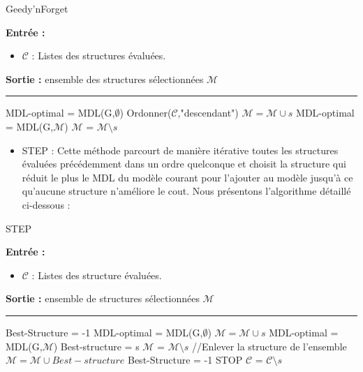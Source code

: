 \documentclass[a4paper,oneside,12pt]{report}
\theoremstyle{definition}
\begin{document}
\begin{algorithm}[H]
\label{alg:GNF}
	\caption{Geedy'nForget}
		\textbf{Entrée :}
		\begin{itemize}[label=$\bullet$]
			\item $\mathcal{C}$ : Listes des structures évaluées.
							
							
			\end{itemize}
	\textbf{Sortie :} ensemble des structures sélectionnées $\mathcal{M}$\\							\noindent\rule{\textwidth}{1pt}
								
	\begin{algorithmic} [1]
	 \STATE MDL-optimal = MDL(G,$\emptyset$)
\STATE Ordonner($\mathcal{C}$,"descendant") 
	\STATE $\mathcal{M} = \mathcal{M} \cup {s}$ 
			\STATE MDL-optimal = MDL(G,$\mathcal{M}$)
		\ELSE 
			\STATE $\mathcal{M}$ = $\mathcal{M} \setminus {s}$  
		\ENDIF
	\ENDFOR   
	\end{algorithmic}
		\end{algorithm}

\begin{itemize}
\item STEP : Cette méthode parcourt de manière itérative toutes les structures évaluées précédemment dans un ordre quelconque et choisit la structure qui réduit le plus le MDL du modèle courant pour l'ajouter au modèle jusqu'à ce qu'aucune structure n'améliore le cout. Nous présentons l'algorithme détaillé ci-dessous :


\end{itemize}

\begin{algorithm}[H]
\label{alg:STEP}
	\caption{STEP}
		\textbf{Entrée :}
		\begin{itemize}[label=$\bullet$]
			\item $\mathcal{C}$ : Listes des structure évaluées.
							
							
			\end{itemize}
	\textbf{Sortie :} ensemble de structures sélectionnées $\mathcal{M}$\\							\noindent\rule{\textwidth}{1pt}
								
	\begin{algorithmic} [1]
	\STATE Best-Structure = -1
	 \STATE MDL-optimal = MDL(G,$\emptyset$)
	\STATE $\mathcal{M} = \mathcal{M} \cup {s}$ 
			\STATE MDL-optimal = MDL(G,$\mathcal{M}$)
			\STATE Best-structure = s
		\ENDIF
		\STATE $\mathcal{M}$ = $\mathcal{M} \setminus {s}$  //Enlever la structure de l'ensemble
	\ENDFOR
	   \STATE $\mathcal{M} = \mathcal{M} \cup {Best-structure}$ 
	   \STATE Best-Structure = -1
	   \ELSE 
	   \STATE STOP
	  \ENDIF
		\STATE $\mathcal{C}$ = $\mathcal{C} \setminus {s}$
	\ENDWHILE
	\end{algorithmic}
		\end{algorithm}
		
\end{document}
